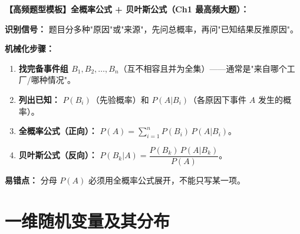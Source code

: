 ﻿\documentclass[lang=cn,11pt]{elegantbook}
\begin{document}
\begin{note}
\textbf{【高频题型模板】全概率公式 + 贝叶斯公式（Ch1 最高频大题）：}

\textbf{识别信号：} 题目分多种"原因"或"来源"，先问总概率，再问"已知结果反推原因"。

\textbf{机械化步骤：}
\begin{enumerate}
    \item \textbf{找完备事件组 $B_1,B_2,\dots,B_n$}（互不相容且并为全集）——通常是"来自哪个工厂/哪种情况"。
    \item \textbf{列出已知：} $P(B_i)$（先验概率）和 $P(A|B_i)$（各原因下事件 $A$ 发生的概率）。
    \item \textbf{全概率公式（正向）：} $P(A)=\sum_{i=1}^n P(B_i)\,P(A|B_i)$。
    \item \textbf{贝叶斯公式（反向）：} $P(B_k|A)=\dfrac{P(B_k)\,P(A|B_k)}{P(A)}$。
\end{enumerate}
\textbf{易错点：} 分母 $P(A)$ 必须用全概率公式展开，不能只写某一项。
\end{note}



\chapter{一维随机变量及其分布}
\end{document}
